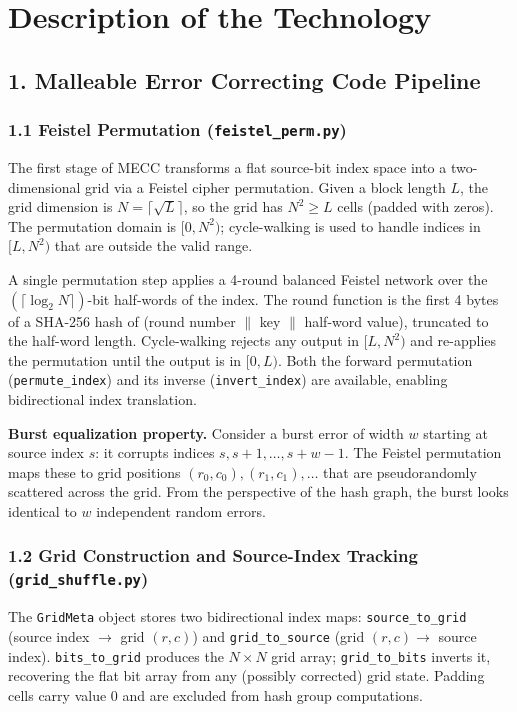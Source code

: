 \section*{Description of the Technology} \label{sec:tech_desc}
\noindent

\subsection*{1. Malleable Error Correcting Code Pipeline}

\subsubsection*{1.1 Feistel Permutation (\texttt{feistel\_perm.py})}

The first stage of MECC transforms a flat source-bit index space into a two-dimensional grid via a Feistel cipher permutation.
Given a block length $L$, the grid dimension is $N = \lceil\sqrt{L}\rceil$, so the grid has $N^2 \geq L$ cells (padded with zeros).
The permutation domain is $[0, N^2)$; cycle-walking is used to handle indices in $[L, N^2)$ that are outside the valid range.

A single permutation step applies a 4-round balanced Feistel network over the $(\lceil\log_2 N\rceil)$-bit half-words of the index.
The round function is the first 4 bytes of a SHA-256 hash of (round number $\| $ key $\| $ half-word value), truncated to the half-word length.
Cycle-walking rejects any output in $[L, N^2)$ and re-applies the permutation until the output is in $[0, L)$.
Both the forward permutation (\texttt{permute\_index}) and its inverse (\texttt{invert\_index}) are available, enabling bidirectional index translation.

\textbf{Burst equalization property.}
Consider a burst error of width $w$ starting at source index $s$: it corrupts indices $s, s{+}1, \ldots, s{+}w{-}1$.
The Feistel permutation maps these to grid positions $(r_0, c_0), (r_1, c_1), \ldots$ that are pseudorandomly scattered across the grid.
From the perspective of the hash graph, the burst looks identical to $w$ independent random errors.

\subsubsection*{1.2 Grid Construction and Source-Index Tracking (\texttt{grid\_shuffle.py})}

The \texttt{GridMeta} object stores two bidirectional index maps: \texttt{source\_to\_grid} (source index $\to$ grid $(r,c)$) and \texttt{grid\_to\_source} (grid $(r,c) \to$ source index).
\texttt{bits\_to\_grid} produces the $N \times N$ grid array; \texttt{grid\_to\_bits} inverts it, recovering the flat bit array from any (possibly corrected) grid state.
Padding cells carry value 0 and are excluded from hash group computations.

